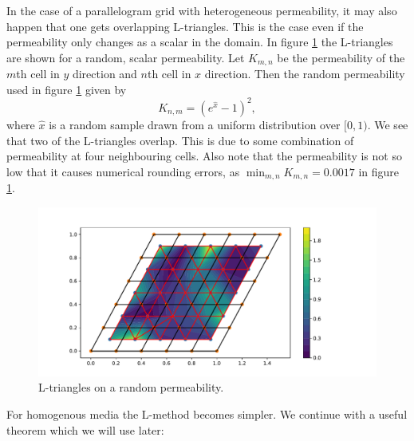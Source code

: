 \documentclass[../Main/main.tex]{subfiles}
\begin{document}
	In the case of a parallelogram grid with heterogeneous permeability, it may also happen that one gets overlapping L-triangles. This is the case even if the permeability only changes as a scalar in the domain. In figure \ref{fig:L-triangles-heterogeneous} the L-triangles are shown for a random, scalar permeability. Let $K_{m,n}$ be the permeability of the $m$th cell in $y$ direction and $n$th cell in $x$ direction. Then the random permeability used in figure \ref{fig:L-triangles-heterogeneous} given by
	\begin{equation}
		K_{n,m} = (e^{\hat{x}}-1)^2,
	\end{equation}
	where $\hat{x}$ is a random sample drawn from a uniform distribution over $[0,1)$. We see that two of the L-triangles overlap. This is due to some combination of permeability at four neighbouring cells. Also note that the permeability is not so low that it causes numerical rounding errors, as $\min_{m,n}K_{m,n}=0.0017$ in figure \ref{fig:L-triangles-heterogeneous}.
	\begin{figure}[H]
		\centering
		\includegraphics[width=1.1\textwidth]{L-triangles-heterogenous.pdf}
		\caption{L-triangles on a random permeability.}
		\label{fig:L-triangles-heterogeneous}
	\end{figure}
	\par 
	For homogenous media the L-method becomes simpler. We continue with a useful theorem which we will use later:
\end{document}
